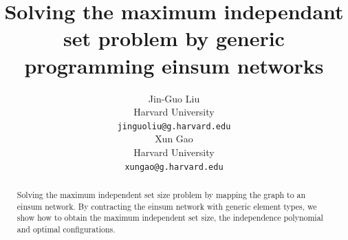 \documentclass{article}
\newcommand{\<}{\langle}
\renewcommand{\>}{\rangle}
\theoremstyle{definition}\newtheorem{definition}{\textit{Definition}}
\begin{document}
\title{Solving the maximum independant set problem by generic programming einsum networks}

\author{Jin-Guo Liu\\
Harvard University\\
\texttt{jinguoliu@g.harvard.edu}\\
\AND
Xun Gao\\
Harvard University\\
\texttt{xungao@g.harvard.edu}\\
}
\maketitle

\begin{abstract}
	Solving the maximum independent set size problem by mapping the graph to an einsum network. 
    By contracting the einsum network with generic element types, we show how to obtain the maximum independent set size,
    the independence polynomial and optimal configurations.
\end{abstract}
\end{document}
